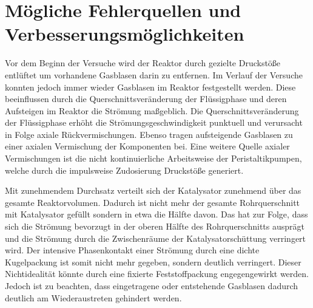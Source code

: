\documentclass[12pt,liststotoc]{report}
\begin{document}




\section{Mögliche Fehlerquellen und Verbesserungsmöglichkeiten}

Vor dem Beginn der Versuche wird der Reaktor durch gezielte Druckstöße entlüftet um vorhandene Gasblasen darin zu entfernen. Im Verlauf der Versuche konnten jedoch immer wieder Gasblasen im Reaktor festgestellt werden. Diese beeinflussen durch die Querschnittsveränderung der Flüssigphase und deren Aufsteigen im Reaktor  die Strömung maßgeblich. Die Querschnittsveränderung der Flüssigphase erhöht die Strömungsgeschwindigkeit punktuell und verursacht in Folge axiale Rückvermischungen. Ebenso tragen aufsteigende Gasblasen zu einer axialen Vermischung der Komponenten bei.
Eine weitere Quelle axialer Vermischungen ist die nicht kontinuierliche Arbeitsweise der Peristaltikpumpen, welche durch die impulsweise Zudosierung Druckstöße generiert.

Mit zunehmendem Durchsatz verteilt sich der Katalysator zunehmend über das gesamte Reaktorvolumen. Dadurch ist nicht mehr der gesamte Rohrquerschnitt mit Katalysator gefüllt sondern in etwa die Hälfte davon. Das hat zur Folge, dass sich die Strömung bevorzugt in der oberen Hälfte des Rohrquerschnitts ausprägt und die Strömung durch die Zwischenräume der Katalysatorschüttung verringert wird. Der intensive Phasenkontakt einer Strömung durch eine dichte Kugelpackung ist somit nicht mehr gegeben, sondern deutlich verringert.
Dieser Nichtidealität könnte durch eine fixierte Feststoffpackung engegengewirkt werden. Jedoch ist zu beachten, dass eingetragene oder entstehende Gasblasen dadurch deutlich am Wiederaustreten gehindert werden.
\end{document}
